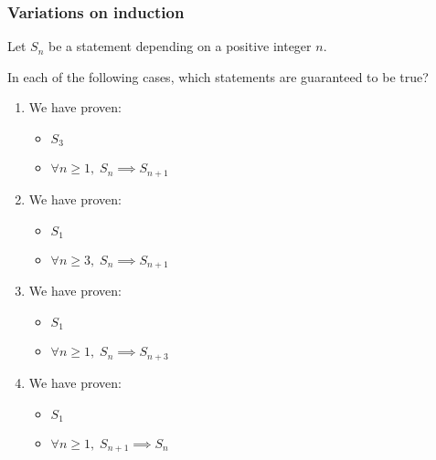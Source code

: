\documentclass[14pt]{beamer}
\begin{document}
	\begin{frame}
		\frametitle{Variations on induction}

		Let $S_{n}$ be a statement depending on a positive integer $n$.

		\vfill

		In each of the following cases, which statements are guaranteed to be true?

		\vfill

		\begin{multicols}{2}
			\begin{enumerate}
				\item We have proven:
					\begin{itemize}
						\item $S_{3}$

						\item $\displaystyle \forall n \geq 1, \; S_{n}\implies S_{n+1}$
					\end{itemize}

				\item We have proven:
					\begin{itemize}
						\item $S_{1}$

						\item $\displaystyle \forall n \geq 3, \; S_{n}\implies S_{n+1}$
					\end{itemize}

				\item We have proven:
					\begin{itemize}
						\item $S_{1}$

						\item $\displaystyle \forall n \geq 1, \; S_{n}\implies S_{n+3}$
					\end{itemize}

				\item We have proven:
					\begin{itemize}
						\item $S_{1}$

						\item $\displaystyle \forall n \geq 1, \; S_{n+1}\implies S_{n}$
					\end{itemize}
			\end{enumerate}
		\end{multicols}

		\vfill
	\end{frame}
\end{document}
